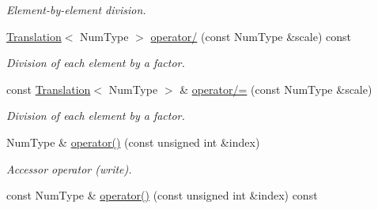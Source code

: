 \begin{DoxyCompactItemize}
\begin{DoxyCompactList}\small\item\em Element-\/by-\/element division. \end{DoxyCompactList}\item 
\hypertarget{singletonscrews_1_1_translation_a9f388930bd5a36c3ee41a25b3993cc0b}{\hyperlink{singletonscrews_1_1_translation}{Translation}$<$ Num\+Type $>$ \hyperlink{singletonscrews_1_1_translation_a9f388930bd5a36c3ee41a25b3993cc0b}{operator/} (const Num\+Type \&scale) const }\label{singletonscrews_1_1_translation_a9f388930bd5a36c3ee41a25b3993cc0b}

\begin{DoxyCompactList}\small\item\em Division of each element by a factor. \end{DoxyCompactList}\item 
\hypertarget{singletonscrews_1_1_translation_a1fe62c31c23a704904d75e49c2a6d0d0}{const \hyperlink{singletonscrews_1_1_translation}{Translation}$<$ Num\+Type $>$ \& \hyperlink{singletonscrews_1_1_translation_a1fe62c31c23a704904d75e49c2a6d0d0}{operator/=} (const Num\+Type \&scale)}\label{singletonscrews_1_1_translation_a1fe62c31c23a704904d75e49c2a6d0d0}

\begin{DoxyCompactList}\small\item\em Division of each element by a factor. \end{DoxyCompactList}\item 
Num\+Type \& \hyperlink{singletonscrews_1_1_translation_a45192a2278b829da40f90224dc2c459c}{operator()} (const unsigned int \&index)
\begin{DoxyCompactList}\small\item\em Accessor operator (write). \end{DoxyCompactList}\item 
\hypertarget{singletonscrews_1_1_translation_ac4de9205cab4f722b9018a1e8a699be0}{const Num\+Type \& \hyperlink{singletonscrews_1_1_translation_ac4de9205cab4f722b9018a1e8a699be0}{operator()} (const unsigned int \&index) const }\label{singletonscrews_1_1_translation_ac4de9205cab4f722b9018a1e8a699be0}


\end{DoxyCompactItemize}
